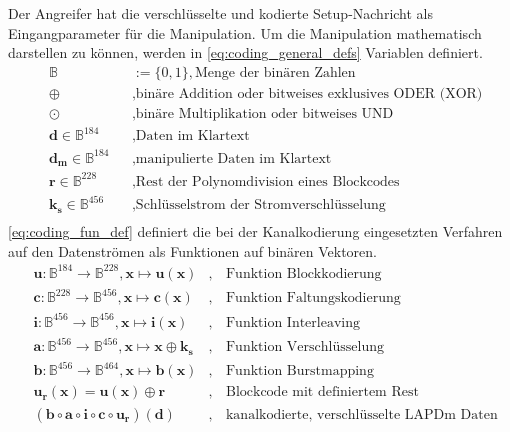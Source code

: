 Der Angreifer hat die verschlüsselte und kodierte Setup-Nachricht als Eingangparameter für die Manipulation. Um die Manipulation mathematisch darstellen zu können, werden in \ref{eq:coding_general_defs} Variablen definiert.
\begin{equation}\label{eq:coding_general_defs}
\begin{aligned}
& \mathbb{B}          				  & &:= \{0,1\}, \text{Menge der binären Zahlen} \\
& \oplus                              & &, \text{binäre Addition oder bitweises exklusives ODER (XOR)} \\
& \odot                               & &, \text{binäre Multiplikation oder bitweises UND} \\
& \boldsymbol{d} \in \mathbb{B}^{184}              & &, \text{Daten im Klartext} \\
& \boldsymbol{d_m} \in \mathbb{B}^{184}            & &, \text{manipulierte Daten im Klartext} \\
& \boldsymbol{r} \in \mathbb{B}^{228}              & &, \text{Rest der Polynomdivision eines Blockcodes} \\
& \boldsymbol{k_s} \in \mathbb{B}^{456}            & &, \text{Schlüsselstrom der Stromverschlüsselung} \\
\end{aligned}
\end{equation}\noindent
\ref{eq:coding_fun_def} definiert die bei der Kanalkodierung eingesetzten Verfahren auf den Datenströmen als Funktionen auf binären Vektoren.
\begin{equation}\label{eq:coding_fun_def}
\begin{aligned}
& \boldsymbol{u}: \mathbb{B}^{184} \to \mathbb{B}^{228}, \boldsymbol{x} \mapsto \boldsymbol{u}(\boldsymbol{x})  & ,& \,\text{Funktion Blockkodierung} \\
& \boldsymbol{c}: \mathbb{B}^{228} \to \mathbb{B}^{456}, \boldsymbol{x} \mapsto \boldsymbol{c}(\boldsymbol{x})  & ,& \,\text{Funktion Faltungskodierung} \\
& \boldsymbol{i}: \mathbb{B}^{456} \to \mathbb{B}^{456}, \boldsymbol{x} \mapsto \boldsymbol{i}(\boldsymbol{x})  & ,& \,\text{Funktion Interleaving} \\
& \boldsymbol{a}: \mathbb{B}^{456} \to \mathbb{B}^{456}, \boldsymbol{x} \mapsto \boldsymbol{x} \oplus \boldsymbol{k_s}  & ,& \,\text{Funktion Verschlüsselung} \\
& \boldsymbol{b}: \mathbb{B}^{456} \to \mathbb{B}^{464}, \boldsymbol{x} \mapsto \boldsymbol{b}(\boldsymbol{x})  & ,& \,\text{Funktion Burstmapping} \\
& \boldsymbol{u_r}(\boldsymbol{x}) = \boldsymbol{u}(\boldsymbol{x}) \oplus \boldsymbol{r}   				    & ,& \,\text{Blockcode mit definiertem Rest} \\
& \left( \boldsymbol{b} \circ \boldsymbol{a} \circ  \boldsymbol{i} \circ \boldsymbol{c} \circ \boldsymbol{u_r} \right) \left(\boldsymbol{d}\right)          								              & ,& \,\text{kanalkodierte, verschlüsselte LAPDm Daten}
\end{aligned}
\end{equation}\noindent
